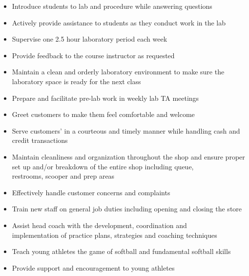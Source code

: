 \documentclass[10pt,letter,ragged2e,withhyper]{altacv}
\begin{document}
\begin{paracol}{2}

\begin{itemize}
\item Introduce students to lab and procedure while answering questions
\item Actively provide assistance to students as they conduct work in the lab
\item Supervise one 2.5 hour laboratory period each week
\item Provide feedback to the course instructor as requested
\item Maintain a clean and orderly laboratory environment to make sure the laboratory space is ready for the next class
\item Prepare and facilitate pre-lab work in weekly lab TA meetings
\end{itemize}

\divider

\begin{itemize}
\item Greet customers to make them feel comfortable and welcome
\item Serve customers’ in a courteous and timely manner while handling cash and credit transactions
\item Maintain cleanliness and organization throughout the shop and ensure proper set up and/or breakdown of the entire shop including queue,\\ restrooms, scooper and prep areas
\item Effectively handle customer concerns and complaints
\item Train new staff on general job duties including opening and closing the store
\end{itemize}

\divider

\begin{itemize}
\item Assist head coach with the development, coordination and \\ implementation of practice plans, strategies and coaching techniques  
\item Teach young athletes the game of softball and fundamental softball skills
\item Provide support and encouragement to young athletes
\end{itemize}


\end{paracol}
\end{document}
